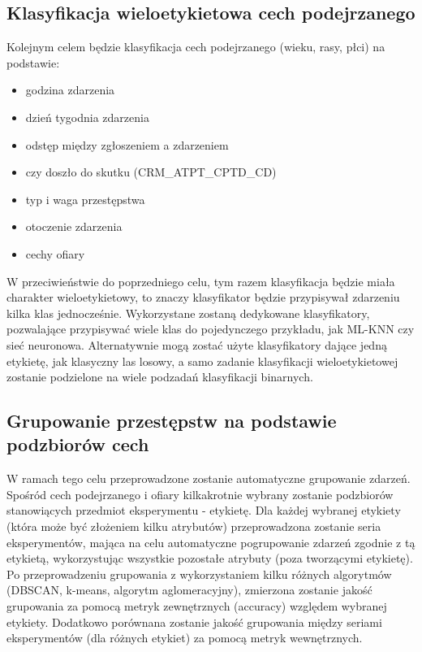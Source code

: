 \documentclass{classrep}
\begin{document}
{        \subsection{Klasyfikacja wieloetykietowa cech podejrzanego} \label{project_goal_2} {
        
            Kolejnym celem będzie klasyfikacja cech podejrzanego (wieku, rasy, płci) na podstawie:
            \begin{itemize}
                \item godzina zdarzenia
                \item dzień tygodnia zdarzenia
                \item odstęp między zgłoszeniem a zdarzeniem
                \item czy doszło do skutku (CRM\_ATPT\_CPTD\_CD)
                \item typ i waga przestępstwa
                \item otoczenie zdarzenia
                \item cechy ofiary
            \end{itemize}
            W przeciwieństwie do poprzedniego celu, tym razem klasyfikacja będzie miała charakter wieloetykietowy, to znaczy klasyfikator będzie przypisywał zdarzeniu kilka klas jednocześnie. Wykorzystane zostaną dedykowane klasyfikatory, pozwalające przypisywać wiele klas do pojedynczego przykładu, jak ML-KNN czy sieć neuronowa. Alternatywnie mogą zostać użyte klasyfikatory dające jedną etykietę, jak klasyczny las losowy, a samo zadanie klasyfikacji wieloetykietowej zostanie podzielone na wiele podzadań klasyfikacji binarnych.
        }
        
        \subsection{Grupowanie przestępstw na podstawie podzbiorów cech} \label{project_goal_3} {
            W ramach tego celu przeprowadzone zostanie automatyczne grupowanie zdarzeń. Spośród cech podejrzanego i ofiary kilkakrotnie wybrany zostanie podzbiorów stanowiących przedmiot eksperymentu - etykietę. Dla każdej wybranej etykiety (która może być złożeniem kilku atrybutów) przeprowadzona zostanie seria eksperymentów, mająca na celu automatyczne pogrupowanie zdarzeń zgodnie z tą etykietą, wykorzystując wszystkie pozostałe atrybuty (poza tworzącymi etykietę). Po przeprowadzeniu grupowania z wykorzystaniem kilku różnych algorytmów (DBSCAN, k-means, algorytm aglomeracyjny), zmierzona zostanie jakość grupowania za pomocą metryk zewnętrznych (accuracy) względem wybranej etykiety. Dodatkowo porównana zostanie jakość grupowania między seriami eksperymentów (dla różnych etykiet) za pomocą metryk wewnętrznych.
        }

    }
\end{document}
